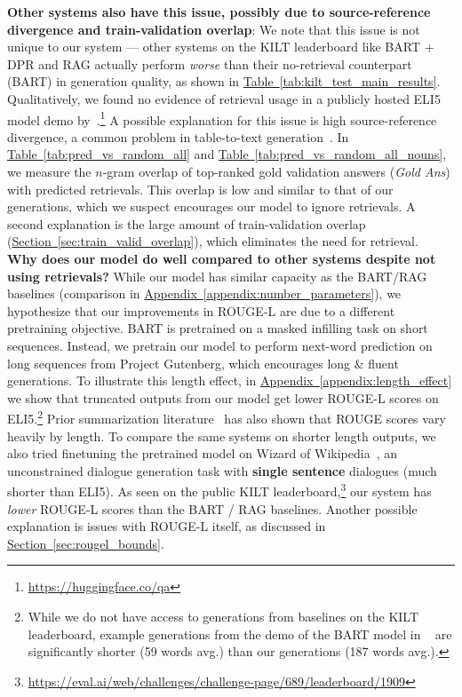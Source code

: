 \documentclass[11pt]{article}
\newcommand{\namedref}[2]{\hyperref[#2]{#1~\ref*{#2}}}
\newcommand{\sectionref}[1]{\namedref{Section}{#1}}
\newcommand{\tableref}[1]{\namedref{Table}{#1}}
\newcommand{\appendixref}[1]{\namedref{Appendix}{#1}}
\begin{document}
\noindent \textbf{Other systems also have this issue, possibly due to source-reference divergence and train-validation overlap}: We note that this issue is not unique to our system --- other systems on the KILT leaderboard like BART + DPR and RAG actually perform \emph{worse} than their no-retrieval counterpart (BART) in generation quality, as shown in \tableref{tab:kilt_test_main_results}. Qualitatively, we found no evidence of retrieval usage in a publicly hosted ELI5 model demo by~\citet{jernite2020}.\footnote{\url{https://huggingface.co/qa}} A possible explanation for this issue is high source-reference divergence, a common problem in table-to-text generation~\citep{wiseman2017challenges, tian2019sticking}. In \tableref{tab:pred_vs_random_all} and \tableref{tab:pred_vs_random_all_nouns}, we measure the $n$-gram overlap of top-ranked gold validation answers (\emph{Gold Ans}) with predicted retrievals. This overlap is low and similar to that of our generations, which we suspect encourages our model to ignore retrievals. A second explanation is the large amount of train-validation overlap (\sectionref{sec:train_valid_overlap}), which eliminates the need for retrieval.\\


\noindent \textbf{Why does our model do well compared to other systems despite not using retrievals?} While our model has similar capacity as the BART/RAG baselines (comparison in \appendixref{appendix:number_parameters}), we hypothesize that our improvements in ROUGE-L are due to a different pretraining objective. BART is pretrained on a masked infilling task on short sequences. Instead, we pretrain our model to perform next-word prediction on long sequences from Project Gutenberg,  which encourages long \& fluent generations. To illustrate this length effect, in \appendixref{appendix:length_effect} we show that truncated outputs from our model get lower ROUGE-L scores on ELI5.\footnote{While we do not have access to generations from baselines on the KILT leaderboard, example generations from the demo of the BART model in ~\citet{jernite2020} are significantly shorter (59 words avg.) than our generations (187 words avg.).} Prior summarization literature~\citep{sun2019compare} has also shown that ROUGE scores vary heavily by length. To compare the same systems on shorter length outputs, we also tried finetuning the pretrained model on Wizard of Wikipedia~\citep{dinan2019wizard}, an unconstrained dialogue generation task with \textbf{single sentence} dialogues (much shorter than ELI5). As seen on the public KILT leaderboard,\footnote{\url{https://eval.ai/web/challenges/challenge-page/689/leaderboard/1909}} our system has \emph{lower} ROUGE-L scores than the BART / RAG baselines. Another possible explanation is issues with ROUGE-L itself, as discussed in \sectionref{sec:rougel_bounds}.\\
\end{document}
